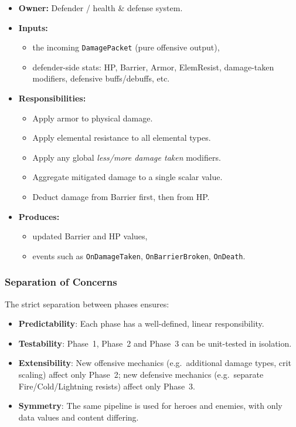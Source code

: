 \begin{itemize}
	\item \textbf{Owner:} Defender / health \& defense system.
	\item \textbf{Inputs:}
	\begin{itemize}
		\item the incoming \texttt{DamagePacket} (pure offensive output),
		\item defender-side stats: HP, Barrier, Armor, ElemResist, damage-taken modifiers,
		defensive buffs/debuffs, etc.
	\end{itemize}
	\item \textbf{Responsibilities:}
	\begin{itemize}
		\item Apply armor to physical damage.
		\item Apply elemental resistance to all elemental types.
		\item Apply any global \emph{less/more damage taken} modifiers.
		\item Aggregate mitigated damage to a single scalar value.
		\item Deduct damage from Barrier first, then from HP.
	\end{itemize}
	\item \textbf{Produces:}
	\begin{itemize}
		\item updated Barrier and HP values,
		\item events such as \texttt{OnDamageTaken}, \texttt{OnBarrierBroken}, \texttt{OnDeath}.
	\end{itemize}
\end{itemize}

\subsubsection{Separation of Concerns}

The strict separation between phases ensures:

\begin{itemize}
	\item \textbf{Predictability}: Each phase has a well-defined, linear responsibility.
	\item \textbf{Testability}: Phase~1, Phase~2 and Phase~3 can be unit-tested in isolation.
	\item \textbf{Extensibility}: New offensive mechanics (e.g.\ additional damage types, 	crit scaling) affect only Phase~2; new defensive mechanics (e.g.\ separate Fire/Cold/Lightning resists) affect only Phase~3.
	\item \textbf{Symmetry}: The same pipeline is used for heroes and enemies, with only data values
	and content differing.
\end{itemize}

